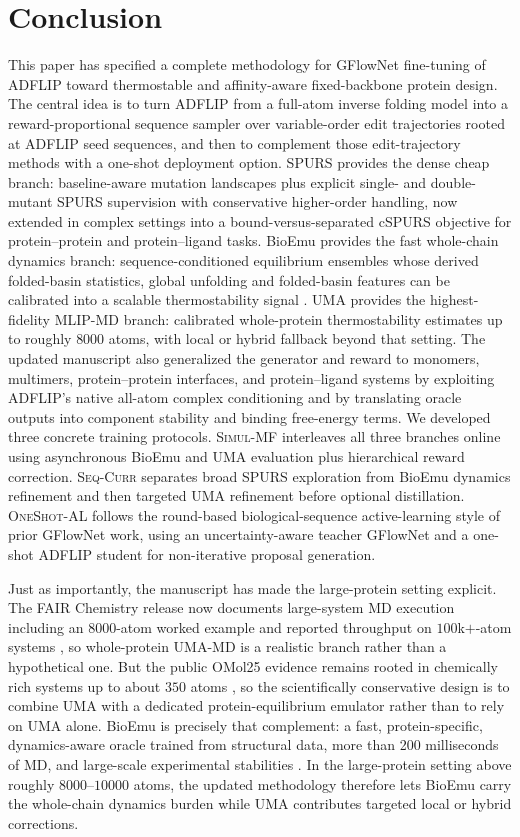 \documentclass[11pt]{article}
\newcommand{\methodI}{\textsc{Simul-MF}}
\newcommand{\methodII}{\textsc{Seq-Curr}}
\newcommand{\methodIII}{\textsc{OneShot-AL}}
\begin{document}
\section{Conclusion}

This paper has specified a complete methodology for GFlowNet fine-tuning of ADFLIP toward thermostable and affinity-aware fixed-backbone protein design. The central idea is to turn ADFLIP from a full-atom inverse folding model into a reward-proportional sequence sampler over variable-order edit trajectories rooted at ADFLIP seed sequences, and then to complement those edit-trajectory methods with a one-shot deployment option. SPURS provides the dense cheap branch: baseline-aware mutation landscapes plus explicit single- and double-mutant SPURS supervision with conservative higher-order handling, now extended in complex settings into a bound-versus-separated cSPURS objective for protein--protein and protein--ligand tasks. BioEmu provides the fast whole-chain dynamics branch: sequence-conditioned equilibrium ensembles whose derived folded-basin statistics, global unfolding and folded-basin features can be calibrated into a scalable thermostability signal \citep{lewis2024bioemu}. UMA provides the highest-fidelity MLIP-MD branch: calibrated whole-protein thermostability estimates up to roughly $8000$ atoms, with local or hybrid fallback beyond that setting. The updated manuscript also generalized the generator and reward to monomers, multimers, protein--protein interfaces, and protein--ligand systems by exploiting ADFLIP's native all-atom complex conditioning and by translating oracle outputs into component stability and binding free-energy terms. We developed three concrete training protocols. \methodI{} interleaves all three branches online using asynchronous BioEmu and UMA evaluation plus hierarchical reward correction. \methodII{} separates broad SPURS exploration from BioEmu dynamics refinement and then targeted UMA refinement before optional distillation. \methodIII{} follows the round-based biological-sequence active-learning style of prior GFlowNet work, using an uncertainty-aware teacher GFlowNet and a one-shot ADFLIP student for non-iterative proposal generation.

Just as importantly, the manuscript has made the large-protein setting explicit. The FAIR Chemistry release now documents large-system MD execution including an $8000$-atom worked example and reported throughput on $100$k$+$-atom systems \citep{fairchem2025github}, so whole-protein UMA-MD is a realistic branch rather than a hypothetical one. But the public OMol25 evidence remains rooted in chemically rich systems up to about $350$ atoms \citep{levine2025omol25}, so the scientifically conservative design is to combine UMA with a dedicated protein-equilibrium emulator rather than to rely on UMA alone. BioEmu is precisely that complement: a fast, protein-specific, dynamics-aware oracle trained from structural data, more than 200 milliseconds of MD, and large-scale experimental stabilities \citep{lewis2024bioemu}. In the large-protein setting above roughly $8000$--$10000$ atoms, the updated methodology therefore lets BioEmu carry the whole-chain dynamics burden while UMA contributes targeted local or hybrid corrections.
\end{document}
